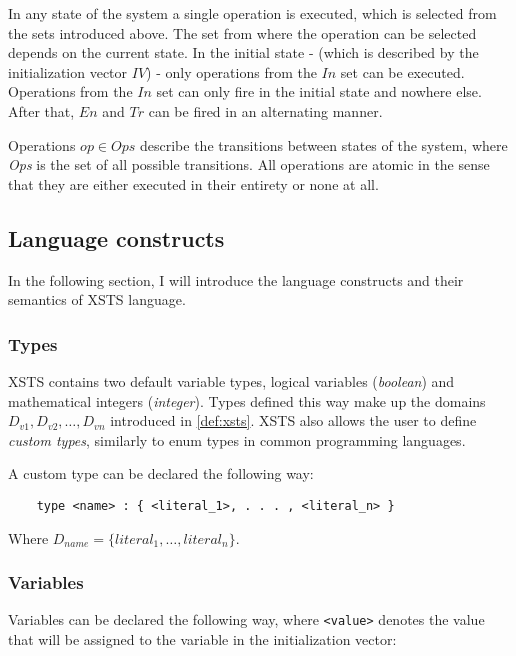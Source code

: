 In any state of the system a single operation is executed, which is selected from the sets introduced above. The set from where the operation can be selected depends on the current state. In the initial state - (which is described by the initialization vector \(IV\)) - only operations from the \(In\) set can be executed. Operations from the \(In\) set can only fire in the initial state and nowhere else. After that, \(En\) and \(Tr\) can be fired in an alternating manner.

Operations \(op \in Ops\) describe the transitions between states of the system, where \emph{Ops} is the set of all possible transitions. All operations are atomic in the sense that they are either executed in their entirety or none at all. 

\subsection{Language constructs}

In the following section, I will introduce the language constructs and their semantics of XSTS language.

\subsubsection{Types}

XSTS contains two default variable types, logical variables (\emph{boolean}) and mathematical integers (\emph{integer}). Types defined this way make up the domains \(D_{v1}, D_{v2}, \dots, D_{vn}\) introduced in \autoref{def:xsts}. XSTS also allows the user to define \emph{custom types}, similarly to enum types in common programming languages.

A custom type can be declared the following way:

\begin{Verbatim}
	type <name> : { <literal_1>, . . . , <literal_n> }
\end{Verbatim}

Where \(D_{name} = \{ literal_1, \dots, literal_n \}\).

\subsubsection{Variables}

Variables can be declared the following way, where \verb|<value>| denotes the value that will be assigned to the variable in the initialization vector:

